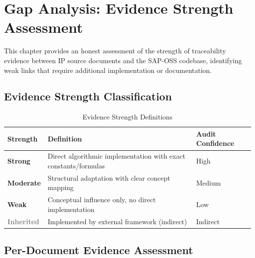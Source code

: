 
\chapter{Gap Analysis: Evidence Strength Assessment}
\label{chap:gap-analysis}

This chapter provides an honest assessment of the strength of traceability evidence between IP source documents and the SAP-OSS codebase, identifying weak links that require additional implementation or documentation.

\section{Evidence Strength Classification}

\begin{table}[H]
\centering
\caption{Evidence Strength Definitions}
\label{tab:evidence-strength}
\begin{tabularx}{\textwidth}{@{}lXl@{}}
\toprule
\textbf{Strength} & \textbf{Definition} & \textbf{Audit Confidence} \\
\midrule
\textcolor{green!60!black}{\textbf{Strong}} & Direct algorithmic implementation with exact constants/formulas & High \\
\textcolor{yellow!60!black}{\textbf{Moderate}} & Structural adaptation with clear concept mapping & Medium \\
\textcolor{red!60!black}{\textbf{Weak}} & Conceptual influence only, no direct implementation & Low \\
\textcolor{gray}{\textbf{Inherited}} & Implemented by external framework (indirect) & Indirect \\
\bottomrule
\end{tabularx}
\end{table}

\section{Per-Document Evidence Assessment}

